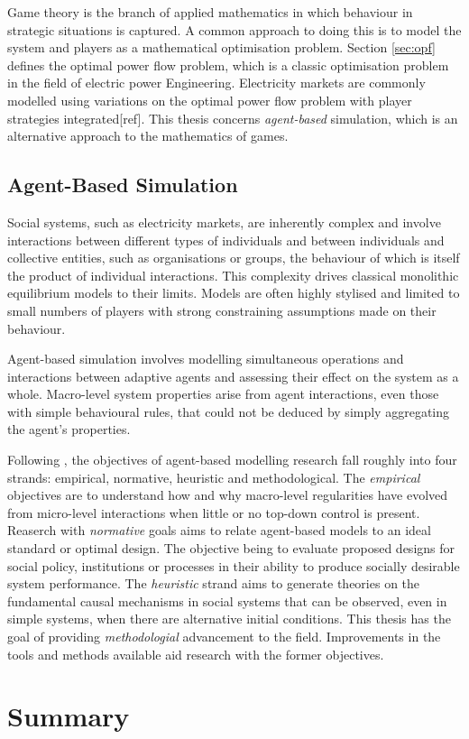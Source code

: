 Game theory is the branch of applied mathematics in which behaviour in
strategic situations is captured.  A common approach to doing this is to
model the system and players as a mathematical optimisation problem.  Section
\ref{sec:opf} defines the optimal power flow problem, which is a classic
optimisation problem in the field of electric power Engineering.  Electricity
markets are commonly modelled using variations on the optimal power flow problem with
player strategies integrated[ref].  This thesis concerns \textit{agent-based}
simulation, which is an alternative approach to the mathematics of games.

\subsection{Agent-Based Simulation}
Social systems, such as electricity markets, are inherently complex and involve
interactions between different types of individuals and between individuals
and collective entities, such as organisations or groups, the behaviour of which
is itself the product of individual interactions.  This complexity
drives classical monolithic equilibrium models to their limits.  Models are
often highly stylised and limited to small numbers of players with strong
constraining assumptions made on their behaviour.

Agent-based simulation involves modelling simultaneous operations and
interactions between adaptive agents and assessing their effect on the system
as a whole.  Macro-level system properties arise from agent interactions, even
those with simple behavioural rules, that could not be deduced by simply
aggregating the agent's properties. %

Following \cite{tesfatsi:handbook}, the objectives of agent-based modelling
research fall roughly into four strands: empirical, normative, heuristic and
methodological. The \textit{empirical} objectives are to understand how and why macro-level
regularities have evolved from micro-level interactions when little or no
top-down control is present.  Reaserch with \textit{normative} goals aims to
relate agent-based models to an ideal standard or optimal design.  The objective being
to evaluate proposed designs for social policy, institutions or processes in
their ability to produce socially desirable system performance.  The
\textit{heuristic} strand aims to generate theories on the fundamental causal
mechanisms in social systems that can be observed, even in simple systems, when there are
alternative initial conditions.  This thesis has the goal of providing
\textit{methodologial} advancement to the field.  Improvements in the tools and
methods available aid research with the former objectives.

\section{Summary}

